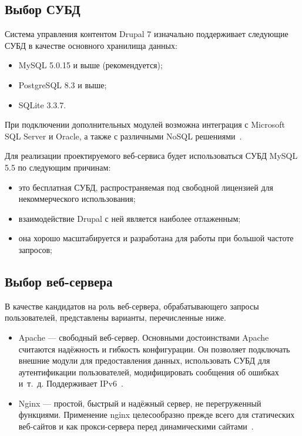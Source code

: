 \subsection{Выбор СУБД}
\label{ssec:choice_db}

Система управления контентом Drupal 7 изначально поддерживает следующие СУБД 
в качестве основного хранилища данных:
\begin{itemize} 
\item
  MySQL 5.0.15 и выше (рекомендуется);

\item
  PostgreSQL 8.3 и выше;

\item
  SQLite 3.3.7.
\end{itemize}

При подключении дополнительных модулей возможна интеграция с Microsoft SQL Server и Oracle,
а также с различными NoSQL решениями~\cite{drupal_database}.

Для реализации проектируемого веб-сервиса будет использоваться СУБД MySQL 5.5 по следующим причинам:
\begin{itemize}
\item
  это бесплатная СУБД, распространяемая под свободной лицензией для некоммерческого использования;
\item
  взаимодействие Drupal с ней является наиболее отлаженным;
\item
  она хорошо масштабируется и разработана для работы при большой частоте запросов;
\end{itemize}

\subsection{Выбор веб-сервера}
\label{ssec:choice_web-server}

В качестве кандидатов на роль веб-сервера, обрабатывающего запросы пользователей,
представлены варианты, перечисленные ниже.

\begin{itemize}
  \item Apache --- свободный веб-сервер. Основными достоинствами Apache считаются надёжность и гибкость конфигурации.
    Он позволяет подключать внешние модули для предоставления данных, использовать 
    СУБД для аутентификации пользователей, модифицировать сообщения об ошибках и~т.~д. Поддерживает IPv6~\cite{wiki_apache}.

  \item Nginx --- простой, быстрый и надёжный сервер, не перегруженный функциями.
    Применение nginx целесообразно прежде всего для статических веб-сайтов
    и как прокси-сервера перед динамическими сайтами~\cite{wiki_nginx}.
\end{itemize}


